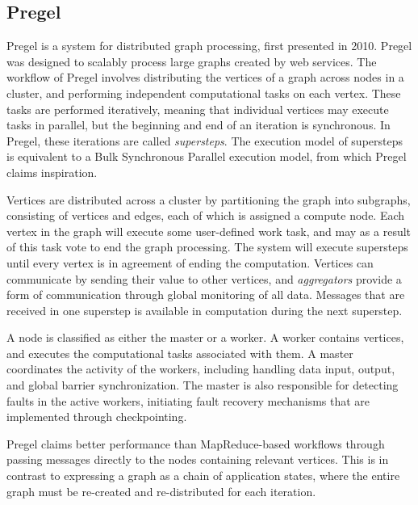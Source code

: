 \documentclass{uit-report}
\begin{document}
\subsection{Pregel}
Pregel \cite{pregel} is a system for distributed graph processing, first presented in 2010. Pregel was designed to scalably process large graphs created by web services. The workflow of Pregel involves distributing the vertices of a graph across nodes in a cluster, and performing independent computational tasks on each vertex. These tasks are performed iteratively, meaning that individual vertices may execute tasks in parallel, but the beginning and end of an iteration is synchronous. In Pregel, these iterations are called \emph{supersteps}. The execution model of supersteps is equivalent to a Bulk Synchronous Parallel execution model, from which Pregel claims inspiration. 

Vertices are distributed across a cluster by partitioning the graph into subgraphs, consisting of vertices and edges, each of which is assigned a compute node. Each vertex in the graph will execute some user-defined work task, and may as a result of this task vote to end the graph processing. The system will execute supersteps until every vertex is in agreement of ending the computation. Vertices can communicate by sending their value to other vertices, and \emph{aggregators} provide a form of communication through global monitoring of all data. Messages that are received in one superstep is available in computation during the next superstep.

A node is classified as either the master or a worker. A worker contains vertices, and executes the computational tasks associated with them. A master coordinates the activity of the workers, including handling data input, output, and global barrier synchronization. The master is also responsible for detecting faults in the active workers, initiating fault recovery mechanisms that are implemented through checkpointing.

Pregel claims better performance than MapReduce-based workflows through passing messages directly to the nodes containing relevant vertices. This is in contrast to expressing a graph as a chain of application states, where the entire graph must be re-created and re-distributed for each iteration.
\end{document}
